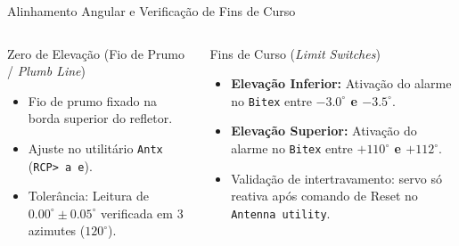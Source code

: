 ﻿\documentclass[aspectratio=169]{beamer}
\begin{document}
\begin{frame}{Alinhamento Angular e Verifica{\c{c}}{\~a}o de Fins de Curso}
    \begin{columns}[T]
        \begin{column}{0.48\textwidth}
            \begin{block}{Zero de Eleva{\c{c}}{\~a}o (Fio de Prumo / \textit{Plumb Line})}
                \begin{itemize}
                    \item Fio de prumo fixado na borda superior do refletor.
                    \item Ajuste no utilit{\'a}rio \texttt{Antx} (\texttt{RCP> a e}).
                    \item Toler{\^a}ncia: Leitura de $0.00^\circ \pm 0.05^\circ$ verificada em 3 azimutes ($120^\circ$).
                \end{itemize}
            \end{block}
        \end{column}
        \begin{column}{0.48\textwidth}
            \begin{block}{Fins de Curso (\textit{Limit Switches})}
                \begin{itemize}
                    \item \textbf{Eleva{\c{c}}{\~a}o Inferior:} Ativa{\c{c}}{\~a}o do alarme no \texttt{Bitex} entre \textbf{$-3.0^\circ$ e $-3.5^\circ$}.
                    \item \textbf{Eleva{\c{c}}{\~a}o Superior:} Ativa{\c{c}}{\~a}o do alarme no \texttt{Bitex} entre \textbf{$+110^\circ$ e $+112^\circ$}.
                    \item Valida{\c{c}}{\~a}o de intertravamento: servo s{\'o} reativa ap{\'o}s comando de Reset no \texttt{Antenna utility}.
                \end{itemize}
            \end{block}
        \end{column}
    \end{columns}
\end{frame}
\end{document}
